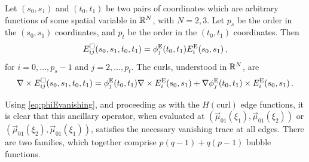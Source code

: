 \begin{definition*}
Let $(s_0,s_1)$ and $(t_0,t_1)$ be two pairs of coordinates which are arbitrary functions of some spatial variable in $\mathbb{R}^N$, with $N=2,3$. Let $p_s$ be the order in the $(s_0,s_1)$ coordinates, and $p_t$ be the order in the $(t_0,t_1)$ coordinates. Then
\begin{equation}
    E_{ij}^{\square}(s_0,s_1,t_0,t_1)=\phi_j^{\mathrm{E}}(t_0,t_1)E_i^{\mathrm{E}}(s_0,s_1)\,,
\end{equation}
for $i=0,\ldots,p_s-1$ and $j=2,\ldots,p_t$. The curls, understood in $\mathbb{R}^N$, are
\begin{equation}
    \nabla\times E_{ij}^{\square}(s_0,s_1,t_0,t_1)=\phi_j^{\mathrm{E}}(t_0,t_1)\nabla\times E_i^{\mathrm{E}}(s_0,s_1)
    	+\nabla\phi_j^{\mathrm{E}}(t_0,t_1)\times E_i^{\mathrm{E}}(s_0,s_1)\,.
\end{equation}
\end{definition*}
Using \eqref{eq:phiEvanishing}, and proceeding as with the $H(\mathrm{curl})$ edge functions, it is clear that this ancillary operator, when evaluated at  $(\vec{\mu}_{01}(\xi_1),\vec{\mu}_{01}(\xi_2))$ or  $(\vec{\mu}_{01}(\xi_2),\vec{\mu}_{01}(\xi_1))$, satisfies the necessary vanishing trace at all edges. 
There are two families, which together comprise $p(q-1)+q(p-1)$ bubble functions.

